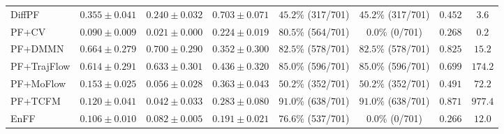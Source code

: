 \begin{table}[t]
{\begin{tabular}{lccccccc}
DiffPF
& $0.355 \pm 0.041$ & $0.240 \pm 0.032$ & $0.703 \pm 0.071$ & $45.2\%$ (317/701) & $45.2\%$ (317/701) & $0.452$ & $3.6$ \\
PF+CV
& $0.090 \pm 0.009$ & $0.021 \pm 0.000$ & $0.224 \pm 0.019$ & $80.5\%$ (564/701) & $0.0\%$ (0/701) & $0.268$ & $0.2$ \\
PF+DMMN
& $0.664 \pm 0.279$ & $0.700 \pm 0.290$ & $0.352 \pm 0.300$ & $82.5\%$ (578/701) & $82.5\%$ (578/701) & $0.825$ & $15.2$ \\
PF+TrajFlow
& $0.614 \pm 0.291$ & $0.633 \pm 0.301$ & $0.436 \pm 0.320$ & $85.0\%$ (596/701) & $85.0\%$ (596/701) & $0.699$ & $174.2$ \\
PF+MoFlow
& $0.153 \pm 0.025$ & $0.056 \pm 0.028$ & $0.363 \pm 0.043$ & $50.2\%$ (352/701) & $50.2\%$ (352/701) & $0.491$ & $72.2$ \\
PF+TCFM
& $0.120 \pm 0.041$ & $0.042 \pm 0.033$ & $0.283 \pm 0.080$ & $\mathbf{91.0\%}$ (638/701) & $\mathbf{91.0\%}$ (638/701) & $\mathbf{0.871}$ & $977.4$ \\
EnFF
& $0.106 \pm 0.010$ & $0.082 \pm 0.005$ & $0.191 \pm 0.021$ & $76.6\%$ (537/701) & $0.0\%$ (0/701) & $0.266$ & $12.0$ \\
\hline
\end{tabular}%
}
\end{table}
